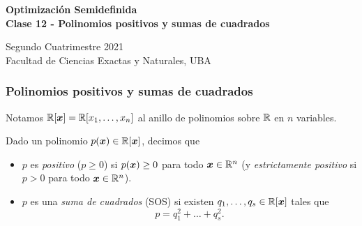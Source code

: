 \documentclass[aspectratio=169,12pt,spanish]{beamer}
\begin{document}

\begin{frame}

 \begin{center}

\Large\textbf{Optimización Semidefinida} \\
\large\textbf{Clase 12 - Polinomios positivos y sumas de cuadrados}




\vspace{1cm}
 Segundo Cuatrimestre 2021
 \\
 {\small Facultad de Ciencias Exactas y Naturales, UBA}
 \end{center}

\end{frame}



\begin{frame}

\frametitle{Polinomios positivos y sumas de cuadrados}

Notamos $\mathbb{R}[\bm{x}] = \mathbb{R}[x_1, \dots, x_n]$ al anillo de polinomios sobre $\mathbb{R}$ en $n$ variables.

Dado un polinomio $p(\bm{x}) \in \mathbb{R}[\bm{x}]$, decimos que
\begin{itemize}
\item $p$ es \emph{positivo} ($p \ge 0$) si $p(\bm{x}) \ge 0$ para todo $\bm{x} \in \mathbb{R}^n$ (y \emph{estrictamente positivo} si $p > 0$ para todo $\bm{x} \in \mathbb{R}^n$).
\item $p$ es una \emph{suma de cuadrados} (SOS) si existen $q_1, \dots, q_s \in \mathbb{R}[\bm{x}]$ tales que
$$
p = q_1^2 + \dots + q_s^2.
$$
\end{itemize}

\end{frame}

\end{document}
